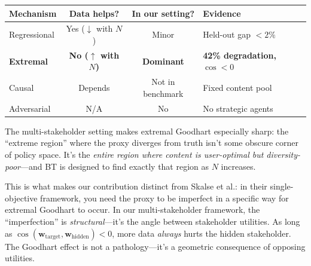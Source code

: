 \documentclass[11pt]{article}
\begin{document}
\begin{center}
\begin{tabular}{lccl}
\toprule
\textbf{Mechanism} & \textbf{Data helps?} & \textbf{In our setting?} & \textbf{Evidence} \\
\midrule
Regressional & Yes ($\downarrow$ with $N$) & Minor
  & Held-out gap $< 2\%$ \\
\textbf{Extremal} & \textbf{No ($\uparrow$ with $N$)} & \textbf{Dominant}
  & \textbf{42\% degradation, $\cos < 0$} \\
Causal & Depends & Not in benchmark
  & Fixed content pool \\
Adversarial & N/A & No
  & No strategic agents \\
\bottomrule
\end{tabular}
\end{center}

The multi-stakeholder setting makes extremal Goodhart especially sharp:
the ``extreme region'' where the proxy diverges from truth isn't some
obscure corner of policy space. It's the \emph{entire region where
content is user-optimal but diversity-poor}---and BT is designed to
find exactly that region as $N$ increases.

This is what makes our contribution distinct from Skalse et al.: in
their single-objective framework, you need the proxy to be imperfect in
a specific way for extremal Goodhart to occur. In our multi-stakeholder
framework, the ``imperfection'' is \emph{structural}---it's the angle
between stakeholder utilities. As long as $\cos(\mathbf{w}_{\text{target}},
\mathbf{w}_{\text{hidden}}) < 0$, more data \emph{always} hurts the
hidden stakeholder. The Goodhart effect is not a pathology---it's a
geometric consequence of opposing utilities.
\end{document}
